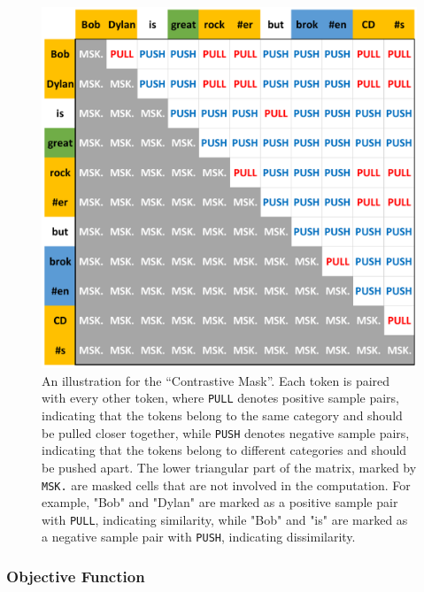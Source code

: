 \documentclass[11pt]{article}
\begin{document}
\begin{figure}[ht]
    \centering
    \includegraphics[width=1\linewidth]{fig_contr.pdf}
    \caption{An illustration for the ``Contrastive Mask''. Each token is paired with every other token, where \texttt{PULL} denotes positive sample pairs, indicating that the tokens belong to the same category and should be pulled closer together, while \texttt{PUSH} denotes negative sample pairs, indicating that the tokens belong to different categories and should be pushed apart. The  lower triangular part of the matrix, marked by \texttt{MSK.} are masked cells that are not involved in the computation. For example, "Bob" and "Dylan" are marked as a positive sample pair with \texttt{PULL}, indicating similarity, while "Bob" and "is" are marked as a negative sample pair with \texttt{PUSH}, indicating dissimilarity.}
    \label{fig:fig_contr.pdf}
\end{figure}


\subsubsection{Objective Function}
\end{document}

